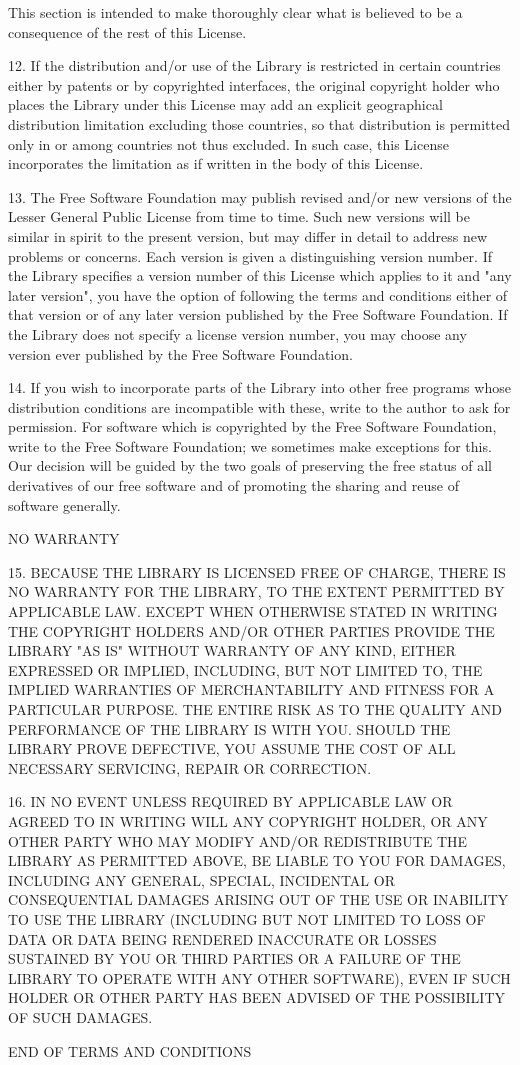 This section is intended to make thoroughly clear what is believed to be a consequence of the rest of this License.

12. If the distribution and/or use of the Library is restricted in certain countries either by patents or by copyrighted interfaces, the original copyright holder who places the Library under this License may add an explicit geographical distribution limitation excluding those countries, so that distribution is permitted only in or among countries not thus excluded. In such case, this License incorporates the limitation as if written in the body of this License.

13. The Free Software Foundation may publish revised and/or new versions of the Lesser General Public License from time to time. Such new versions will be similar in spirit to the present version, but may differ in detail to address new problems or concerns. Each version is given a distinguishing version number. If the Library specifies a version number of this License which applies to it and "any later version", you have the option of following the terms and conditions either of that version or of any later version published by the Free Software Foundation. If the Library does not specify a license version number, you may choose any version ever published by the Free Software Foundation.

14. If you wish to incorporate parts of the Library into other free programs whose distribution conditions are incompatible with these, write to the author to ask for permission. For software which is copyrighted by the Free Software Foundation, write to the Free Software Foundation; we sometimes make exceptions for this. Our decision will be guided by the two goals of preserving the free status of all derivatives of our free software and of promoting the sharing and reuse of software generally.

NO WARRANTY

15. BECAUSE THE LIBRARY IS LICENSED FREE OF CHARGE, THERE IS NO WARRANTY FOR THE LIBRARY, TO THE EXTENT PERMITTED BY APPLICABLE LAW. EXCEPT WHEN OTHERWISE STATED IN WRITING THE COPYRIGHT HOLDERS AND/OR OTHER PARTIES PROVIDE THE LIBRARY "AS IS" WITHOUT WARRANTY OF ANY KIND, EITHER EXPRESSED OR IMPLIED, INCLUDING, BUT NOT LIMITED TO, THE IMPLIED WARRANTIES OF MERCHANTABILITY AND FITNESS FOR A PARTICULAR PURPOSE. THE ENTIRE RISK AS TO THE QUALITY AND PERFORMANCE OF THE LIBRARY IS WITH YOU. SHOULD THE LIBRARY PROVE DEFECTIVE, YOU ASSUME THE COST OF ALL NECESSARY SERVICING, REPAIR OR CORRECTION.

16. IN NO EVENT UNLESS REQUIRED BY APPLICABLE LAW OR AGREED TO IN WRITING WILL ANY COPYRIGHT HOLDER, OR ANY OTHER PARTY WHO MAY MODIFY AND/OR REDISTRIBUTE THE LIBRARY AS PERMITTED ABOVE, BE LIABLE TO YOU FOR DAMAGES, INCLUDING ANY GENERAL, SPECIAL, INCIDENTAL OR CONSEQUENTIAL DAMAGES ARISING OUT OF THE USE OR INABILITY TO USE THE LIBRARY (INCLUDING BUT NOT LIMITED TO LOSS OF DATA OR DATA BEING RENDERED INACCURATE OR LOSSES SUSTAINED BY YOU OR THIRD PARTIES OR A FAILURE OF THE LIBRARY TO OPERATE WITH ANY OTHER SOFTWARE), EVEN IF SUCH HOLDER OR OTHER PARTY HAS BEEN ADVISED OF THE POSSIBILITY OF SUCH DAMAGES.

END OF TERMS AND CONDITIONS 
